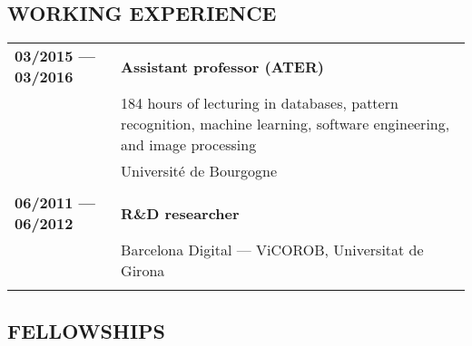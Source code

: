 {\subsection{WORKING EXPERIENCE}

\begin{table}[!h]
\begin{tabular}{p{4cm} p{13cm}}
 \\
\textbf{03/2015 --- 03/2016} & \textbf{Assistant professor (ATER)} \\
& 184 hours of lecturing in databases, pattern recognition, machine learning, software engineering, and image processing \\
& Universit\'e de Bourgogne \\[.5em]  \\
\textbf{06/2011 --- 06/2012} & \textbf{R\&D researcher} \\
& Barcelona Digital --- ViCOROB, Universitat de Girona \\[.5em]  \\
\end{tabular}
\end{table}

\newpage

\subsection{FELLOWSHIPS}

}
